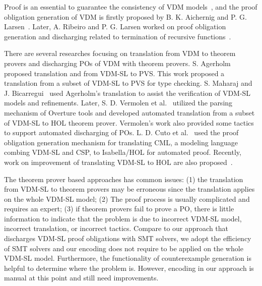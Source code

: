 Proof is an essential to guarantee the consistency of VDM models~\cite{978-3-540-19813-0}, and the proof obligation generation of VDM is firstly proposed by B. K. Aichernig and P. G. Larsen~\cite{AL:97:POGV}. Later, A. Ribeiro and P. G. Larsen worked on proof obligation generation and discharging related to termination of recursive functions~\cite{Ribeiro2010}.

There are several researches focusing on translation from VDM to theorem provers and discharging POs of VDM with theorem provers. S. Agerholm~\cite{Agerholm1996} proposed translation and from VDM-SL to PVS. This work proposed a translation from a subset of VDM-SL to PVS for type checking. S. Maharaj and J. Bicarregui~\cite{632849} used Agerholm's translation to assist the verification of VDM-SL models and refinements. Later, S. D. Vermolen et al.~\cite{Verm:2007:master,Vermolen:2010:PCV:1774088.1774608} utilized the parsing mechanism of Overture tools and developed automated translation from a subset of VDM-SL to HOL theorem prover. Vermolen's work also provided some tactics to support automated discharging of POs. L. D. Cuto et al.~\cite{CFP:14:TVCSAP} used the proof obligation generation mechanism for translating CML, a modeling language combing VDM-SL and CSP, to Isabella/HOL for automated proof. Recently, work on improvement of translating VDM-SL to HOL are also proposed~\cite{CT:15:EOCGTIS}.

The theorem prover based approaches has common issues: (1) the translation from VDM-SL to theorem provers may be erroneous since the translation applies on the whole VDM-SL model; (2) The proof process is usually complicated and requires an expert; (3) if theorem provers fail to prove a PO, there is little information to indicate that the problem is due to incorrect VDM-SL model, incorrect translation, or incorrect tactics. Compare to our approach that discharges VDM-SL proof obligations with SMT solvers, we adopt the efficiency of SMT solvers and our encoding does not require to be applied on the whole VDM-SL model. Furthermore, the functionality of counterexample generation is helpful to determine where the problem is. However, encoding in our approach is manual at this point and still need improvements.

